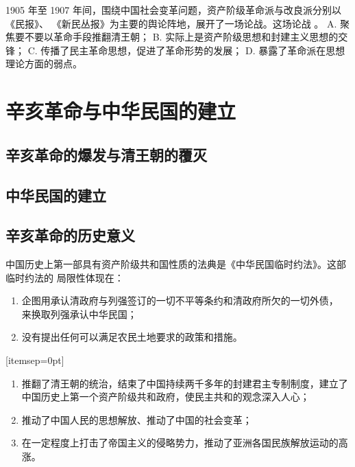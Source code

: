 \documentclass[10pt, UTF8]{ctexbook} %
\begin{document}
\begin{example}
    1905 年至 1907 年间，围绕中国社会变革问题，资产阶级革命派与改良派分别以《民报》、
    《新民丛报》为主要的舆论阵地，展开了一场论战。这场论战 \underline{\qquad \qquad \qquad}。
    \newline
    A. 聚焦要不要以革命手段推翻清王朝；
    \newline
    B. 实际上是资产阶级思想和封建主义思想的交锋；
    \newline
    C. 传播了民主革命思想，促进了革命形势的发展；
    \newline
    D. 暴露了革命派在思想理论方面的弱点。
\end{example}

\section{辛亥革命与中华民国的建立}

\subsection{辛亥革命的爆发与清王朝的覆灭}
\subsection{中华民国的建立}
\subsection{辛亥革命的历史意义}

\newpage

\begin{mdframed}[frametitle={两次辩论}]
    
\end{mdframed}

\begin{mdframed}[frametitle={中华民国的建立与《中华民国临时约法》的局限性}]
    中国历史上第一部具有资产阶级共和国性质的法典是《中华民国临时约法》。这部临时约法的
    局限性体现在：
    \begin{enumerate}[itemsep=0pt]
        \item 企图用承认清政府与列强签订的一切不平等条约和清政府所欠的一切外债，
        来换取列强承认中华民国；
        \item 没有提出任何可以满足农民土地要求的政策和措施。
    \end{enumerate}[itemsep=0pt]
\end{mdframed}

\begin{mdframed}[frametitle={辛亥革命的历史意义}]
\begin{enumerate}[itemsep=0pt]
    \item 推翻了清王朝的统治，结束了中国持续两千多年的封建君主专制制度，建立了中国历史上第一个资产阶级共和政府，使民主共和的观念深入人心；
    \item 推动了中国人民的思想解放、推动了中国的社会变革；
    \item 在一定程度上打击了帝国主义的侵略势力，推动了亚洲各国民族解放运动的高涨。
\end{enumerate}
\end{mdframed}
\end{document}
